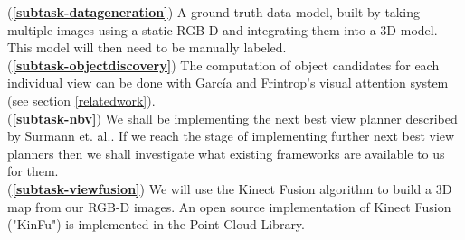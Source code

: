 \documentclass[a4paper,11pt,english]{article}
\begin{document}
(\textbf{\ref{subtask-datageneration}})
A ground truth data model, built by taking multiple images using a static RGB-D and integrating them into a 3D model.
This model will then need to be manually labeled.\\
(\textbf{\ref{subtask-objectdiscovery}})
The computation of object candidates for each individual view can be done with Garc\'{i}a and Frintrop's visual attention system\cite{garcia2013computational} (see section \ref{relatedwork}).\\
(\textbf{\ref{subtask-nbv}}) We shall be implementing the next best view planner described by Surmann et. al.\cite{surmann2003autonomous}.
If we reach the stage of implementing further next best view planners then we shall investigate what existing frameworks are available to us for them. \\
(\textbf{\ref{subtask-viewfusion}})
We will use the Kinect Fusion algorithm to build a 3D map from our RGB-D images.
An open source implementation of Kinect Fusion ("KinFu"\cite{Pirovano2011}) is implemented in the Point Cloud Library.\\
\end{document}

